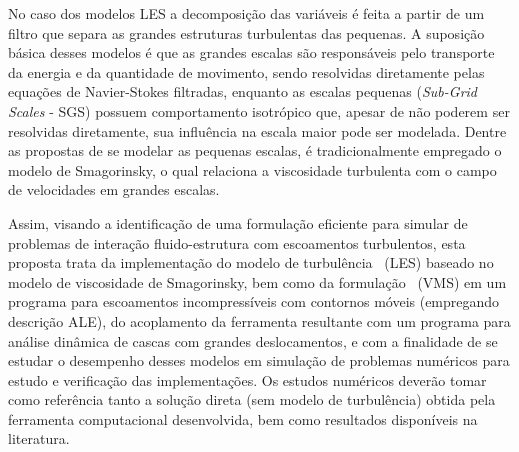 No caso dos modelos LES a decomposição das variáveis é feita a partir de um filtro que separa as grandes estruturas turbulentas das pequenas. A suposição básica desses modelos é que as grandes escalas são responsáveis pelo transporte da energia e da quantidade de movimento, sendo resolvidas diretamente pelas equações de Navier-Stokes filtradas, enquanto as escalas pequenas (\textit{Sub-Grid Scales} - SGS) possuem comportamento isotrópico que, apesar de não poderem ser resolvidas diretamente, sua influência na escala maior pode ser modelada. Dentre as propostas de se modelar as pequenas escalas, é tradicionalmente empregado o modelo de Smagorinsky, o qual relaciona a viscosidade turbulenta com o campo de velocidades em grandes escalas.




Assim, visando a identificação de uma formulação eficiente para simular de problemas de interação fluido-estrutura com escoamentos turbulentos, esta proposta trata da implementação do modelo de turbulência \LES\ (LES) baseado no modelo de viscosidade de Smagorinsky, bem como da formulação \VMS\ (VMS) em um programa para escoamentos incompressíveis com contornos móveis (empregando descrição ALE), do acoplamento da ferramenta resultante com um programa para análise dinâmica de cascas com grandes deslocamentos, e com a finalidade de se estudar o desempenho desses modelos em simulação de problemas numéricos para estudo e verificação das implementações. Os estudos numéricos deverão tomar como referência tanto a solução direta (sem modelo de turbulência) obtida pela ferramenta computacional desenvolvida, bem como resultados disponíveis na literatura.

